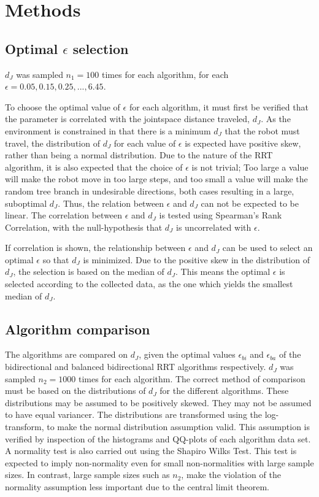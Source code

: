 \section{Methods}
\subsection{Optimal \(\epsilon\) selection}
\(d_J\) was sampled \(n_1=100\) times for each algorithm, for each \(\epsilon=0.05,0.15,0.25,...,6.45\).

To choose the optimal value of \(\epsilon\) for each algorithm,
it must first be verified that the parameter is correlated
with the jointspace distance traveled, \(d_J\).
As the environment is constrained in that there is a minimum \(d_J\)
that the robot must travel, the distribution of \(d_J\) for each
value of \(\epsilon\) is expected have positive skew,
rather than being a normal distribution.
Due to the nature of the RRT algorithm, it is also expected that
the choice of \(\epsilon\) is not trivial;
Too large a value will make the robot move in too large steps,
and too small a value will make the random tree branch in
undesirable directions, both cases resulting in a large, suboptimal \(d_J\).
Thus, the relation between \(\epsilon\) and \(d_J\) can not be expected to be linear.
The correlation between \(\epsilon\) and \(d_J\) is tested using
Spearman's Rank Correlation, with the null-hypothesis that \(d_J\)
is uncorrelated with \(\epsilon\).

If correlation is shown, the relationship
between \(\epsilon\) and \(d_J\) can be used
to select an optimal \(\epsilon\) so that
\(d_J\) is minimized.
Due to the positive skew in the distribution
of \(d_J\), the selection is based on the median
of \(d_J\).
This means the optimal \(\epsilon\) is selected
according to the collected data,
as the one which yields the smallest median of \(d_J\).

\subsection{Algorithm comparison}
The algorithms are compared on \(d_J\),
given the optimal values \(\epsilon_{bi}\) and \(\epsilon_{ba}\)
of the bidirectional and balanced bidirectional RRT algorithms respectively.
\(d_J\) was sampled \(n_2=1000\) times for each algorithm.
The correct method of comparison must be based
on the distributions of \(d_J\) for the different algorithms.
These distributions may be assumed to be positively skewed.
They may not be assumed to have equal variancer.
The distributions are transformed using the log-transform,
to make the normal distribution assumption valid.
This assumption is verified by inspection of the histograms
and QQ-plots of each algorithm data set.
A normality test is also carried out using the Shapiro Wilks Test.
This test is expected to imply non-normality even for small
non-normalities with large sample sizes. In contrast,
large sample sizes such as \(n_2\), make the violation of the normality assumption
less important due to the central limit theorem.

